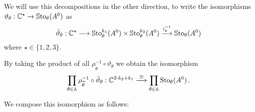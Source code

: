 We will use this decompositions in the other direction, to write the
isomorphisms $\vartheta_\theta:\mathbb{C}^\star\to \operatorname{\mathbb{S}to}_\theta(A^0)$ as
\[
  \bar\vartheta_\theta:
  \mathbb{C}^\star
  \longrightarrow\operatorname{\mathbb{S}to}_\theta^{k_1}(A^0)\times\operatorname{\mathbb{S}to}_\theta^{k_2}(A^0)
  \overset{i_\theta^{-1}}\longrightarrow\operatorname{\mathbb{S}to}_\theta(A^0)
\]
where $\star\in\{1,2,3\}$.

\begin{prop}
  By taking the product of all $\rho_{\tilde\theta}^{-1}\circ\vartheta_\theta$
  we obtain the isomorphism
  \[
    \prod_{\theta\in\mathbb{A}}\rho_{\widetilde\theta}^{-1}\circ\bar\vartheta_\theta:
    \mathbb{C}^{2\cdot k_2 + k_1}
    \overset\cong\longrightarrow
    \prod_{\theta\in\mathbb{A}}\operatorname{Sto}_\theta(A^0) \,.
  \]
\end{prop}

\begin{comment}
\begin{thm}
  The set $\Sto(A^0)$, and thus the classifying set, is in our case isomorphic
  to $\C^{k_1+2\cdot k_2}$.
\end{thm}
\end{comment}
We compose this isomorphism as follows:
